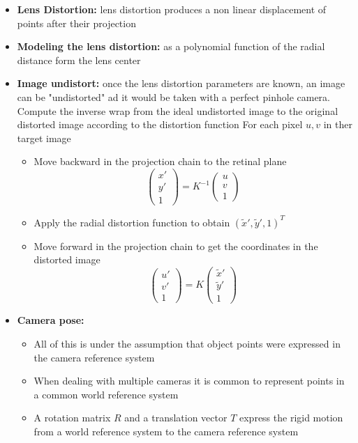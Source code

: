 \documentclass{article}
\begin{document}
\begin{itemize}
\begin{itemize}
        \item \textbf{Lens Distortion:} lens distortion produces a non linear displacement of points after their projection
        \item \textbf{Modeling the lens distortion:} as a polynomial function of the radial distance form the lens center
        \item \textbf{Image undistort:} once the lens distortion parameters are known, an image can be "undistorted" ad it would be taken with a perfect pinhole camera.
        Compute the inverse wrap from the ideal undistorted image to the original distorted image according to the distortion function
        For each pixel \(u,v\) in ther target image
        \begin{itemize}
            \item Move backward in the projection chain to the retinal plane
            \[\begin{pmatrix}x'\\ y'\\ 1\end{pmatrix} = K^{-1} \begin{pmatrix}u\\ v\\ 1\end{pmatrix}\]
            \item Apply the radial distortion function to obtain \((\widetilde{x}', \widetilde{y}', 1)^T\)
            \item Move forward in the projection chain to get the coordinates in the distorted image
            \[\begin{pmatrix}u'\\ v'\\ 1\end{pmatrix} = K \begin{pmatrix}\widetilde{x}'\\ \widetilde{y}'\\ 1\end{pmatrix}\]
        \end{itemize}
        \item \textbf{Camera pose:} 
        \begin{itemize}
            \item All of this is under the assumption that object points were expressed in the camera reference system
            \item When dealing with multiple cameras it is common to represent points in a common world reference system
            \item A rotation matrix \(R\) and a translation vector \(T\) express the rigid motion from a world reference system to the camera reference system

\end{itemize}
\end{itemize}
\end{itemize}
\end{document}
